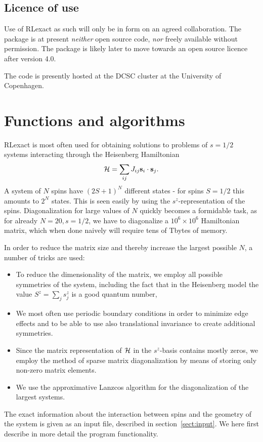 \documentclass{article}
\begin{document}
\subsection{Licence of use}
Use of RLexact as such will only be in form on an agreed collaboration. 
The package is at present {\em neither} open source code, {\em nor} freely available without permission.
The package is likely later to move towards an open source licence after version 4.0.

The code is presently hosted at the DCSC cluster at the University of Copenhagen.

\section{Functions and algorithms} \label{sect:function}
RLexact is most often used for obtaining solutions to problems of $s=1/2$ systems interacting through the Heisenberg Hamiltonian
\begin{equation}
{\cal H} = \sum_{ij} J_{ij} {\bf s}_i \cdot {\bf s}_j . 
\end{equation}
A system of $N$ spins have $(2S+1)^N$ different states - for spins $S=1/2$ this amounts to $2^N$ states.
This is seen easily by using the $s^z$-representation of the spins.
Diagonalization for large values of $N$ quickly becomes a formidable task, as for already $N=20, s=1/2$, we have to 
diagonalize a $10^6 \times 10^6$ Hamiltonian matrix, which when done naively will require tens of Tbytes of memory.

In order to reduce the matrix size and thereby increase the largest possible $N$, a number of tricks are used:
\begin{itemize}
\item To reduce the dimensionality of the matrix, we employ all possible symmetries of the system, including the fact that in
the Heisenberg model the value $S^z = \sum_j s_j^z$ is a good quantum number,
\item We most often use periodic boundary conditions in order to minimize edge effects and to be able to use also translational invariance to create additional symmetries.
\item Since the matrix representation of ${\cal H}$ in the $s^z$-basis contains mostly zeros, we employ the method of sparse matrix diagonalization by means of storing only non-zero matrix elements.
\item We use the approximative Lanzcos algorithm for the diagonalization of the largest systems.
\end{itemize}
The exact information about the interaction between spins and the geometry of the system is given as an input file, described in
section~\ref{sect:input}. We here first describe in more detail the program functionality.
\end{document}
